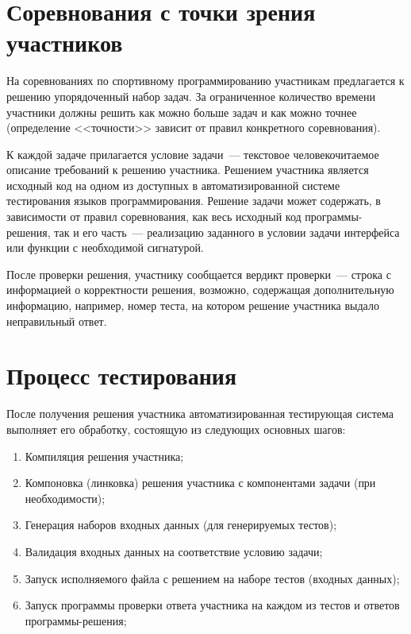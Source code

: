 \documentclass[times,specification,annotation]{style/itmo-student-thesis/itmo-student-thesis}
\begin{document}
\section{Соревнования с точки зрения участников}

На соревнованиях по спортивному программированию участникам предлагается к решению упорядоченный набор задач. За ограниченное количество времени участники должны решить как можно больше задач и как можно точнее (определение <<точности>> зависит от правил конкретного соревнования).

К каждой задаче прилагается условие задачи~--- текстовое человекочитаемое описание требований к решению участника. Решением участника является исходный код на одном из доступных в автоматизированной системе тестирования языков программирования. Решение задачи может содержать, в зависимости от правил соревнования, как весь исходный код программы-решения, так и его часть~--- реализацию заданного в условии задачи интерфейса или функции с необходимой сигнатурой.

После проверки решения, участнику сообщается вердикт проверки~--- строка с информацией о корректности решения, возможно, содержащая дополнительную информацию, например, номер теста, на котором решение участника выдало неправильный ответ.

\section{Процесс тестирования}

После получения решения участника автоматизированная тестирующая система выполняет его обработку, состоящую из следующих основных шагов:

\begin{enumerate}
    \item Компиляция решения участника;
    \item Компоновка (линковка) решения участника с компонентами задачи (при необходимости);
    \item Генерация наборов входных данных (для генерируемых тестов);
    \item Валидация входных данных на соответствие условию задачи;
    \item Запуск исполняемого файла с решением на наборе тестов (входных данных);
    \item Запуск программы проверки ответа участника на каждом из тестов и ответов программы-решения;
\end{enumerate}
\end{document}
